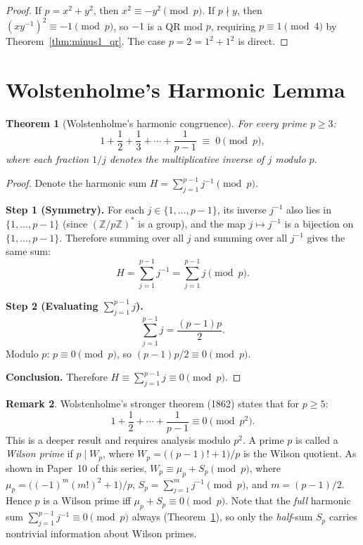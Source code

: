 \documentclass[12pt,a4paper]{amsart}
\newtheorem{theorem}{Theorem}[section]
\theoremstyle{definition}
\newtheorem{remark}[theorem]{Remark}
\newcommand{\Z}{\mathbb{Z}}
\begin{document}
\begin{proof}
  If $p = x^2 + y^2$, then $x^2 \equiv -y^2 \pmod p$.  If $p \nmid y$, then
  $(xy^{-1})^2 \equiv -1 \pmod p$, so $-1$ is a QR mod $p$, requiring
  $p \equiv 1 \pmod 4$ by Theorem~\ref{thm:minus1_qr}.
  The case $p = 2 = 1^2 + 1^2$ is direct.
\end{proof}

\section{Wolstenholme's Harmonic Lemma}

\begin{theorem}[Wolstenholme's harmonic congruence]\label{thm:harmonic}
  For every prime $p \geq 3$:
  \[
    1 + \frac{1}{2} + \frac{1}{3} + \cdots + \frac{1}{p-1}
    \;\equiv\; 0 \pmod p,
  \]
  where each fraction $1/j$ denotes the multiplicative inverse of $j$ modulo $p$.
\end{theorem}

\begin{proof}
  Denote the harmonic sum $H = \sum_{j=1}^{p-1} j^{-1} \pmod p$.

  \textbf{Step 1 (Symmetry).}
  For each $j \in \{1, \ldots, p-1\}$, its inverse $j^{-1}$ also lies in
  $\{1, \ldots, p-1\}$ (since $(\Z/p\Z)^*$ is a group), and the map
  $j \mapsto j^{-1}$ is a bijection on $\{1, \ldots, p-1\}$.
  Therefore summing over all $j$ and summing over all $j^{-1}$ gives the same
  sum:
  \[
    H = \sum_{j=1}^{p-1} j^{-1} = \sum_{j=1}^{p-1} j \pmod p.
  \]

  \textbf{Step 2 (Evaluating $\sum_{j=1}^{p-1} j$).}
  \[
    \sum_{j=1}^{p-1} j = \frac{(p-1)p}{2}.
  \]
  Modulo $p$: $p \equiv 0 \pmod p$, so $(p-1)p/2 \equiv 0 \pmod p$.

  \textbf{Conclusion.}
  Therefore $H \equiv \sum_{j=1}^{p-1} j \equiv 0 \pmod p$. \qedhere
\end{proof}

\begin{remark}
  Wolstenholme's stronger theorem (1862) states that for $p \geq 5$:
  \[
    1 + \frac{1}{2} + \cdots + \frac{1}{p-1} \equiv 0 \pmod{p^2}.
  \]
  This is a deeper result and requires analysis modulo $p^2$.
  A prime $p$ is called a \emph{Wilson prime} if $p \mid W_p$, where
  $W_p = \bigl((p-1)!+1\bigr)/p$ is the Wilson quotient.
  As shown in Paper~10 of this series, $W_p \equiv \mu_p + S_p \pmod{p}$,
  where $\mu_p = \bigl((-1)^m(m!)^2+1\bigr)/p$,
  $S_p = \sum_{j=1}^{m} j^{-1} \pmod{p}$, and $m = (p-1)/2$.
  Hence $p$ is a Wilson prime iff $\mu_p + S_p \equiv 0 \pmod{p}$.
  Note that the \emph{full} harmonic sum $\sum_{j=1}^{p-1} j^{-1} \equiv 0 \pmod p$
  always (Theorem~\ref{thm:harmonic}), so only the \emph{half}-sum $S_p$
  carries nontrivial information about Wilson primes.
\end{remark}
\end{document}
